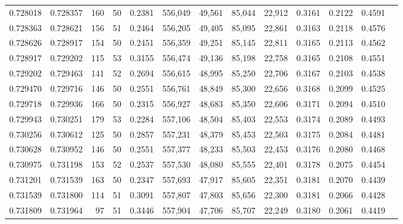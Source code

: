 \begin{tabular}{rrrrrrrrrrrrr}
0.728018 & 0.728357 &   160 &  50 &                                     0.2381 & 556,049 &  49,561 &  85,044 &  22,912 & 0.3161 & 0.2122 & 0.4591 \\
0.728363 & 0.728621 &   156 &  51 &                                     0.2464 & 556,205 &  49,405 &  85,095 &  22,861 & 0.3163 & 0.2118 & 0.4576 \\
0.728626 & 0.728917 &   154 &  50 &                                     0.2451 & 556,359 &  49,251 &  85,145 &  22,811 & 0.3165 & 0.2113 & 0.4562 \\
0.728917 & 0.729202 &   115 &  53 &                                     0.3155 & 556,474 &  49,136 &  85,198 &  22,758 & 0.3165 & 0.2108 & 0.4551 \\
0.729202 & 0.729463 &   141 &  52 &                                     0.2694 & 556,615 &  48,995 &  85,250 &  22,706 & 0.3167 & 0.2103 & 0.4538 \\
0.729470 & 0.729716 &   146 &  50 &                                     0.2551 & 556,761 &  48,849 &  85,300 &  22,656 & 0.3168 & 0.2099 & 0.4525 \\
0.729718 & 0.729936 &   166 &  50 &                                     0.2315 & 556,927 &  48,683 &  85,350 &  22,606 & 0.3171 & 0.2094 & 0.4510 \\
0.729943 & 0.730251 &   179 &  53 &                                     0.2284 & 557,106 &  48,504 &  85,403 &  22,553 & 0.3174 & 0.2089 & 0.4493 \\
0.730256 & 0.730612 &   125 &  50 &                                     0.2857 & 557,231 &  48,379 &  85,453 &  22,503 & 0.3175 & 0.2084 & 0.4481 \\
0.730628 & 0.730952 &   146 &  50 &                                     0.2551 & 557,377 &  48,233 &  85,503 &  22,453 & 0.3176 & 0.2080 & 0.4468 \\
0.730975 & 0.731198 &   153 &  52 &                                     0.2537 & 557,530 &  48,080 &  85,555 &  22,401 & 0.3178 & 0.2075 & 0.4454 \\
0.731201 & 0.731539 &   163 &  50 &                                     0.2347 & 557,693 &  47,917 &  85,605 &  22,351 & 0.3181 & 0.2070 & 0.4439 \\
0.731539 & 0.731800 &   114 &  51 &                                     0.3091 & 557,807 &  47,803 &  85,656 &  22,300 & 0.3181 & 0.2066 & 0.4428 \\
0.731809 & 0.731964 &    97 &  51 &                                     0.3446 & 557,904 &  47,706 &  85,707 &  22,249 & 0.3180 & 0.2061 & 0.4419 \\

\end{tabular}
